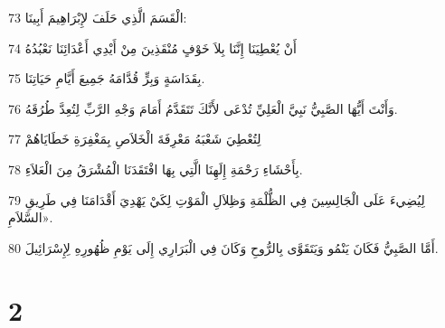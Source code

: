 \par 73 الْقَسَمَ الَّذِي حَلَفَ لإِبْرَاهِيمَ أَبِينَا:
\par 74 أَنْ يُعْطِيَنَا إِنَّنَا بِلاَ خَوْفٍ مُنْقَذِينَ مِنْ أَيْدِي أَعْدَائِنَا نَعْبُدُهُ
\par 75 بِقَدَاسَةٍ وَبِرٍّ قُدَّامَهُ جَمِيعَ أَيَّامِ حَيَاتِنَا.
\par 76 وَأَنْتَ أَيُّهَا الصَّبِيُّ نَبِيَّ الْعَلِيِّ تُدْعَى لأَنَّكَ تَتَقَدَّمُ أَمَامَ وَجْهِ الرَّبِّ لِتُعِدَّ طُرُقَهُ.
\par 77 لِتُعْطِيَ شَعْبَهُ مَعْرِفَةَ الْخَلاَصِ بِمَغْفِرَةِ خَطَايَاهُمْ
\par 78 بِأَحْشَاءِ رَحْمَةِ إِلَهِنَا الَّتِي بِهَا افْتَقَدَنَا الْمُشْرَقُ مِنَ الْعَلاَءِ.
\par 79 لِيُضِيءَ عَلَى الْجَالِسِينَ فِي الظُّلْمَةِ وَظِلاَلِ الْمَوْتِ لِكَيْ يَهْدِيَ أَقْدَامَنَا فِي طَرِيقِ السَّلاَمِ».
\par 80 أَمَّا الصَّبِيُّ فَكَانَ يَنْمُو وَيَتَقَوَّى بِالرُّوحِ وَكَانَ فِي الْبَرَارِي إِلَى يَوْمِ ظُهُورِهِ لِإِسْرَائِيلَ.

\chapter{2}

